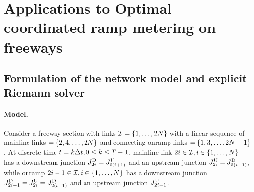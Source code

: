 \section{Applications to Optimal coordinated ramp metering on freeways\label{sec:Applications-to-Optimal}}


\subsection{Formulation of the network model and explicit Riemann solver\label{sub:Formulation-of-the}}


\paragraph{Model.}

Consider a freeway section with links $\links=\intrange 1{2\nlinks}$
with a linear sequence of mainline links $=\intrange{2,4}{2\nlinks}$
and connecting onramp links $=\intrange{1,3}{2\nlinks-1}$. At discrete
time $t=k\Delta t,0\le k\le T-1$, mainline link $2\link\in\links,i\in\intrange 1{\nlinks}$
has a downstream junction $\jdown{2\link}=\jup{2\left(\link+1\right)}$
and an upstream junction $\jup{2\link}=\jdown{2\left(\link-1\right)}$,
while onramp $2\link-1\in\links,i\in\intrange 1{\nlinks}$ has a downstream
junction $\jdown{2\link-1}=\jup{2\link}=\jdown{2\left(\link-1\right)}$
and an upstream junction $J_{2i-1}^{\text{U}}$.

